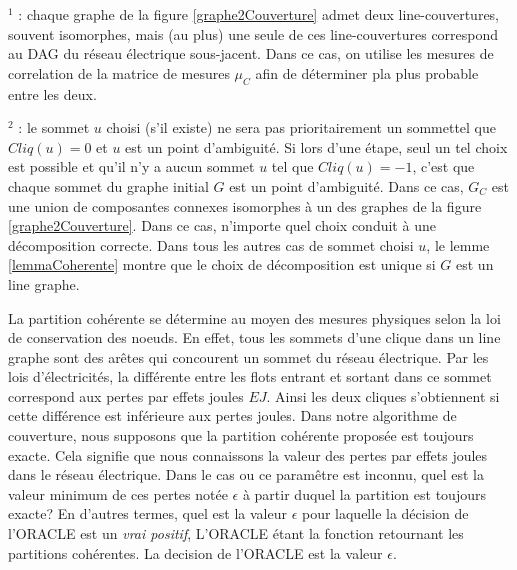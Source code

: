 $^1$ : chaque graphe de la figure \ref{graphe2Couverture} admet deux line-couvertures, souvent isomorphes, mais (au plus) une seule de ces line-couvertures correspond au DAG du r\'eseau \'electrique sous-jacent. Dans ce cas, on utilise les mesures de correlation de la matrice de mesures $\mu_C$ afin de d\'eterminer pla plus probable entre les deux.
\newline

 $^2$ :  le sommet $u$ choisi (s'il existe) ne sera pas prioritairement un sommettel que $Cliq(u) = 0$ et $u$ est un point d'ambiguit\'e. Si lors d'une \'etape, seul un tel choix est possible et qu'il n'y a aucun sommet $u$ tel que $Cliq(u) = -1$, c'est que chaque sommet du graphe initial $G$ est un point d'ambiguit\'e.
 Dans ce cas, $G_C$ est une union de composantes connexes isomorphes \`a un des graphes de la figure  \ref{graphe2Couverture}.
Dans ce cas, n'importe quel choix conduit \`a une d\'ecomposition correcte.
Dans tous les autres cas de sommet choisi $u$, le lemme \ref{lemmaCoherente} montre que le choix de d\'ecomposition est unique si $G$ est un line graphe.
\newline

La partition coh\'erente se d\'etermine au moyen des mesures physiques selon la loi de conservation des noeuds. 
En effet, tous les sommets d'une clique dans un line graphe sont des ar\^etes qui concourent un sommet du r\'eseau \'electrique. 
Par les lois d'\'electricit\'es, la diff\'erente entre les flots entrant et sortant dans ce sommet correspond aux pertes par effets joules $EJ$. 
Ainsi les deux cliques s'obtiennent si cette diff\'erence est inf\'erieure aux pertes joules.
Dans notre algorithme de couverture, nous supposons que la partition coh\'erente propos\'ee est toujours exacte. Cela signifie que nous connaissons la valeur des pertes par effets joules dans le r\'eseau \'electrique. Dans le cas ou ce param\^etre est inconnu, quel est la valeur minimum de ces pertes not\'ee $\epsilon$ \`a partir duquel la partition est toujours exacte?
En d'autres termes, quel est la valeur $\epsilon$ pour laquelle la d\'ecision de l'ORACLE est un {\em vrai positif}, L'ORACLE \'etant la fonction retournant les partitions coh\'erentes. 
La decision de l'ORACLE est la valeur $\epsilon$.

